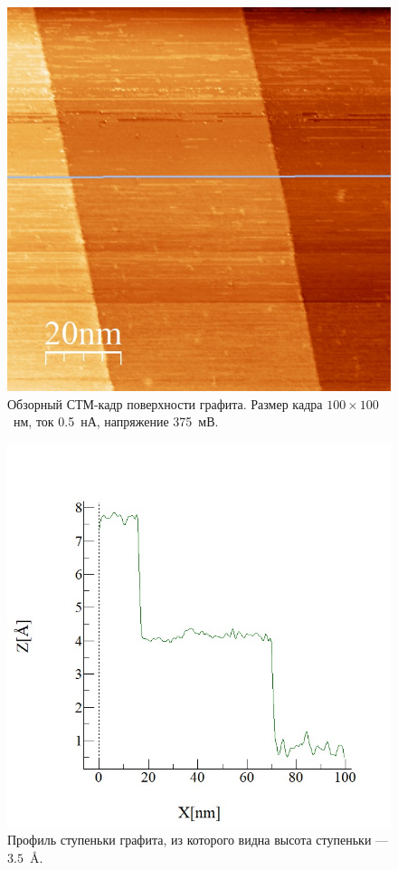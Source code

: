 \documentclass[a4paper, 12pt]{article}
\begin{document}
	\begin{figure}[H]
		\centering
		\includegraphics[width=0.58\linewidth]{../STM_data/Step/Step_final}
		\caption{Обзорный СТМ-кадр поверхности графита. Размер кадра $100\times100$~нм, ток 0.5~нА, напряжение 375~мВ.}
		\label{fig:2_step}
	\end{figure}
	
	\begin{figure}[H]
		\centering
		\includegraphics[width=0.6\linewidth]{../STM_data/Step/Step_final_Graph_enh.jpg}
		\caption{Профиль ступеньки графита, из которого видна высота ступеньки --- $3.5$~\AA.}
		\label{fig:2_step_anal}
	\end{figure}
\end{document}
